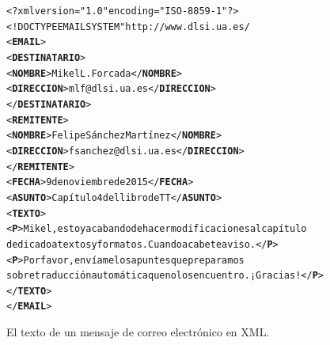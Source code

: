 \begin{figure}
\begin{center}
\begin{alltt}
<?xml version="1.0" encoding="ISO-8859-1"?>
<!DOCTYPE EMAIL SYSTEM "http://www.dlsi.ua.es/%
<\textbf{EMAIL}>
  <\textbf{DESTINATARIO}>
    <\textbf{NOMBRE}>Mikel L. Forcada</\textbf{NOMBRE}>
    <\textbf{DIRECCION}>mlf@dlsi.ua.es</\textbf{DIRECCION}>
  </\textbf{DESTINATARIO}>
  <\textbf{REMITENTE}>
    <\textbf{NOMBRE}>Felipe Sánchez Martínez</\textbf{NOMBRE}>
    <\textbf{DIRECCION}>fsanchez@dlsi.ua.es</\textbf{DIRECCION}>
  </\textbf{REMITENTE}>
  <\textbf{FECHA}>9 de noviembre de 2015</\textbf{FECHA}>
  <\textbf{ASUNTO}>Capítulo 4 del libro de TT</\textbf{ASUNTO}>
  <\textbf{TEXTO}>
    <\textbf{P}>Mikel, estoy acabando de hacer modificaciones al capítulo
    dedicado a textos y formatos. Cuando acabe te aviso.</\textbf{P}>
    <\textbf{P}>Por favor, envíame los apuntes que preparamos 
    sobre traducción automática que no los encuentro. ¡Gracias!</\textbf{P}>
  </\textbf{TEXTO}>
</\textbf{EMAIL}>
\end{alltt}
\end{center}
\caption{El texto de un mensaje de correo electrónico en XML.}
\label{fg:faxXML}
\end{figure}

